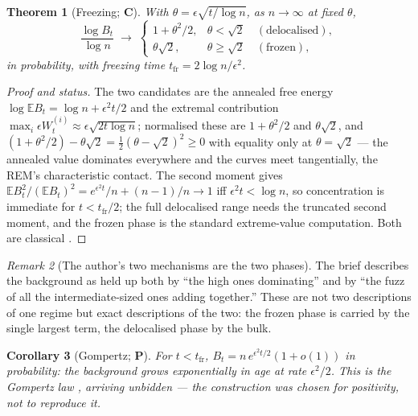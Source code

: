 \documentclass[11pt]{article}
\numberwithin{equation}{section}
\theoremstyle{plain}
\newtheorem{theorem}{Theorem}[section]
\newtheorem{corollary}[theorem]{Corollary}
\theoremstyle{definition}
\theoremstyle{remark}
\newtheorem{remark}[theorem]{Remark}
\newcommand{\E}{\mathbb{E}}
\begin{document}
\begin{theorem}[Freezing; \textbf{C}]\label{tc:thm:freezing}
With $\theta=\epsilon\sqrt{t/\log n}$, as $n\to\infty$ at fixed
$\theta$,
\begin{equation}\label{tc:eq:freezing}
\frac{\log B_t}{\log n}\;\longrightarrow\;
\begin{cases}
1+\theta^{2}/2, & \theta<\sqrt2\quad(\text{delocalised}),\\
\theta\sqrt2, & \theta\ge\sqrt2\quad(\text{frozen}),
\end{cases}
\end{equation}
in probability, with freezing time
$t_{\mathrm{fr}}=2\log n/\epsilon^{2}$.
\end{theorem}

\begin{proof}[Proof and status]
The two candidates are the annealed free energy
$\log\E B_t=\log n+\epsilon^{2}t/2$ and the extremal contribution
$\max_i\epsilon W^{(i)}_t\approx\epsilon\sqrt{2t\log n}$; normalised
these are $1+\theta^{2}/2$ and $\theta\sqrt2$, and
$(1+\theta^{2}/2)-\theta\sqrt2=\tfrac12(\theta-\sqrt2)^{2}\ge0$ with
equality only at $\theta=\sqrt2$ --- the annealed value dominates
everywhere and the curves meet tangentially, the REM's characteristic
contact. The second moment gives
$\E B_t^{2}/(\E B_t)^{2}=e^{\epsilon^{2}t}/n+(n-1)/n\to1$ iff
$\epsilon^{2}t<\log n$, so concentration is immediate for
$t<t_{\mathrm{fr}}/2$; the full delocalised range needs the truncated
second moment, and the frozen phase is the standard extreme-value
computation. Both are classical \cite{Der81,Bov06,BBM05}.
\end{proof}

\begin{remark}[The author's two mechanisms are the two phases]
\label{tc:rem:twophases}
The brief describes the background as held up both by ``the high ones
dominating'' and by ``the fuzz of all the intermediate-sized ones adding
together.'' These are not two descriptions of one regime but exact
descriptions of the two: the frozen phase is carried by the single
largest term, the delocalised phase by the bulk.
\end{remark}

\begin{corollary}[Gompertz; \textbf{P}]\label{tc:cor:gompertz}
For $t<t_{\mathrm{fr}}$, $B_t=n\,e^{\epsilon^{2}t/2}(1+o(1))$ in
probability: the background grows exponentially in age at rate
$\epsilon^{2}/2$. This is the Gompertz law \cite{Gom25}, arriving
unbidden --- the construction was chosen for positivity, not to
reproduce it.
\end{corollary}
\end{document}
